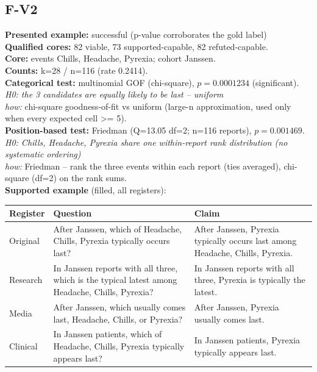 \documentclass[11pt]{article}
\begin{document}
\subsection*{F-V2}
\textbf{Presented example:} successful (p-value corroborates the gold label) \\
\textbf{Qualified cores:} 82 viable, 73 supported-capable, 82 refuted-capable. \\
\textbf{Core:} events Chills, Headache, Pyrexia; cohort Janssen. \\
\textbf{Counts:} k=28 / n=116  (rate 0.2414). \\
\textbf{Categorical test:} multinomial GOF (chi-square), $p = 0.0001234$ (significant). \\
\emph{H0: the 3 candidates are equally likely to be last -- uniform} \\
\emph{how:} chi-square goodness-of-fit vs uniform (large-n approximation, used only when every expected cell >= 5). \\
\textbf{Position-based test:} Friedman (Q=13.05 df=2; n=116 reports), $p = 0.001469$. \\
\emph{H0: Chills, Headache, Pyrexia share one within-report rank distribution (no systematic ordering)} \\
\emph{how:} Friedman -- rank the three events within each report (ties averaged), chi-square (df=2) on the rank sums. \\
\textbf{Supported example} (filled, all registers): \\
\begin{tabularx}{\linewidth}{@{}l L L@{}}
\toprule
\textbf{Register} & \textbf{Question} & \textbf{Claim} \\
\midrule
Original & After Janssen, which of Headache, Chills, Pyrexia typically occurs last? & After Janssen, Pyrexia typically occurs last among Headache, Chills, Pyrexia. \\
Research & In Janssen reports with all three, which is the typical latest among Headache, Chills, Pyrexia? & In Janssen reports with all three, Pyrexia is typically the latest. \\
Media & After Janssen, which usually comes last, Headache, Chills, or Pyrexia? & After Janssen, Pyrexia usually comes last. \\
Clinical & In Janssen patients, which of Headache, Chills, Pyrexia typically appears last? & In Janssen patients, Pyrexia typically appears last. \\
\bottomrule
\end{tabularx}
\end{document}
